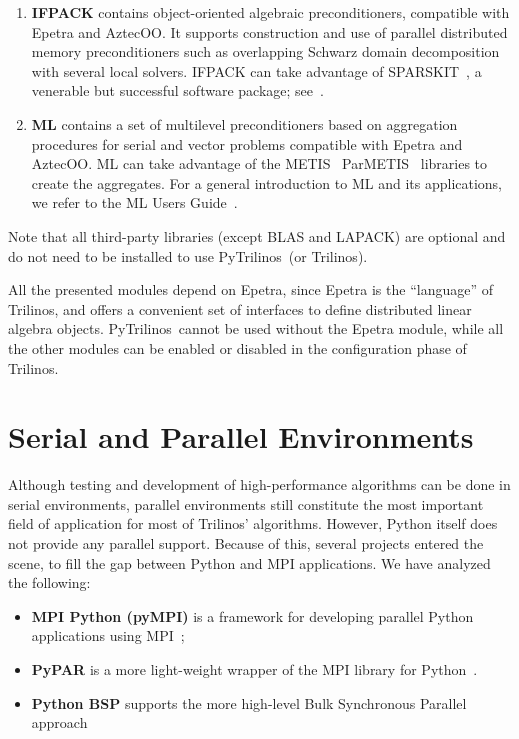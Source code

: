 \documentclass[10pt,relax]{SANDreport}
\newcommand{\PyTrilinos}{{PyTrilinos}}
\begin{document}
\begin{enumerate}
\item {\bf IFPACK} contains object-oriented algebraic preconditioners,
  compatible with Epetra and AztecOO.  It supports construction and
  use of parallel distributed memory preconditioners such as
  overlapping Schwarz domain decomposition with several local solvers.
  IFPACK can take advantage of SPARSKIT~\cite{sparskit}, a venerable
  but successful software package; see~\cite{ifpack-guide}.

\item {\bf ML} contains a set of multilevel preconditioners based on
  aggregation procedures for serial and vector problems compatible with Epetra
  and AztecOO. ML can take
  advantage of the METIS~\cite{metis} ParMETIS~\cite{parmetis}
  libraries to create the aggregates.  For a general introduction to
  ML and its applications, we refer to the ML Users
  Guide~\cite{ml-guide}.

\end{enumerate}

Note that all third-party libraries (except BLAS and LAPACK) are
optional and do not need to be installed to use \PyTrilinos\ (or
Trilinos).

All the presented modules depend on Epetra, since Epetra is the ``language''
of Trilinos, and offers a convenient set of interfaces to define distributed
linear algebra objects.  \PyTrilinos\ cannot be used without the Epetra
module, while all the other modules can be enabled or disabled in the
configuration phase of Trilinos.

\section{Serial and Parallel Environments}
\label{sec:serial}

Although testing and development of high-performance algorithms can be done in
serial environments, parallel environments still constitute the most
important field of application for most of Trilinos' algorithms. However,
  Python itself does not provide any parallel support. Because of this,
  several projects entered the scene, to fill the gap between Python and
  MPI applications. We have analyzed the following:
\begin{itemize}
\item {\bf MPI Python (pyMPI)} is a framework for developing parallel Python
  applications using MPI~\cite{MPI-Python};
\item {\bf PyPAR} is a more light-weight wrapper of the MPI library
  for Python~\cite{pypar}.
\item {\bf Python BSP} supports the more high-level Bulk Synchronous
  Parallel approach~\cite{bsp}
\end{itemize}
\end{document}
